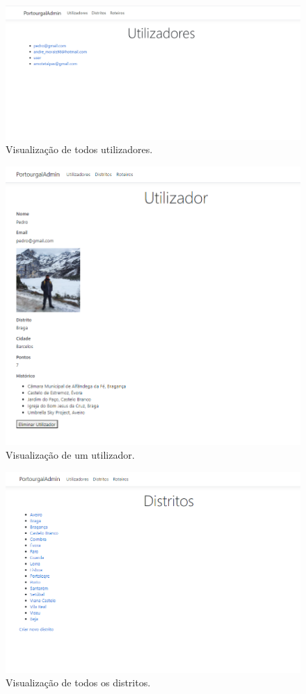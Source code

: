 \begin{figure}[H]
\centering
\includegraphics[width=0.7\linewidth]{images/site_utilizadores.png}
\caption{Visualização de todos utilizadores.}
\end{figure}

\begin{figure}[H]
\centering
\includegraphics[width=0.7\linewidth]{images/site_utilizador.png}
\caption{Visualização de um utilizador.}
\end{figure}

\begin{figure}[H]
\centering
\includegraphics[width=0.7\linewidth]{images/site_distritos.png}
\caption{Visualização de todos os distritos.}
\end{figure}

